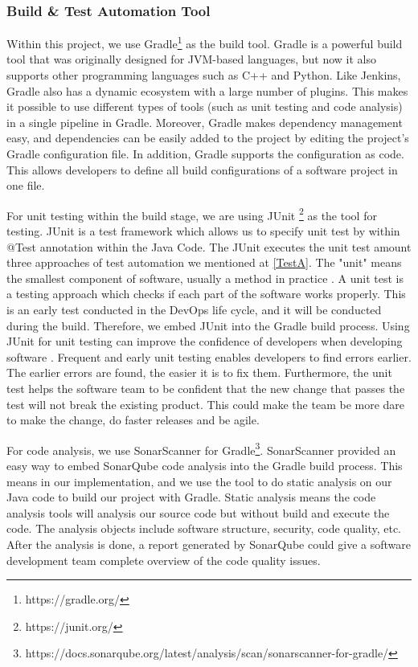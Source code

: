 \subsubsection{Build \& Test Automation Tool}
Within this project, we use Gradle\footnote{https://gradle.org/} as the build tool.
Gradle is a powerful build tool that was originally designed for JVM-based languages, but now it also supports other programming languages such as C++ and Python.
Like Jenkins, Gradle also has a dynamic ecosystem with a large number of plugins. This makes it possible to use different types of tools (such as unit testing and code analysis) in a single pipeline in Gradle. 
Moreover, Gradle makes dependency management easy, and dependencies can be easily added to the project by editing the project's Gradle configuration file. In addition, Gradle supports the configuration as code. This allows developers to define all build configurations of a software project in one file.
\par
For unit testing within the build stage, we are using JUnit \footnote{https://junit.org/} as the tool for testing. JUnit is a test framework which allows us to specify unit test by within @Test annotation within the Java Code. The JUnit executes the unit test amount three approaches of test automation we mentioned at \ref{TestA}. The "unit" means the smallest component of software, usually a method in practice \cite{UnitTest65:online}. A unit test is a testing approach which checks if each part of the software works properly. 
This is an early test conducted in the DevOps life cycle, and it will be conducted during the build. Therefore, we embed JUnit into the Gradle build process. Using JUnit for unit testing can improve the confidence of developers when developing software \cite{UnitTest65:online}. Frequent and early unit testing enables developers to find errors earlier. The earlier errors are found, the easier it is to fix them. Furthermore, the unit test helps the software team to be confident that the new change that passes the test will not break the existing product. This could make the team be more dare to make the change, do faster releases and be agile.
\par
For code analysis, we use SonarScanner for Gradle\footnote{https://docs.sonarqube.org/latest/analysis/scan/sonarscanner-for-gradle/}. SonarScanner provided an easy way to embed SonarQube code analysis into the Gradle build process. This means in our implementation, and we use the tool to do static analysis on our Java code to build our project with Gradle. Static analysis means the code analysis tools will analysis our source code but without build and execute the code. The analysis objects include software structure, security, code quality, etc. After the analysis is done, a report generated by SonarQube could give a software development team complete overview of the code quality issues. 
